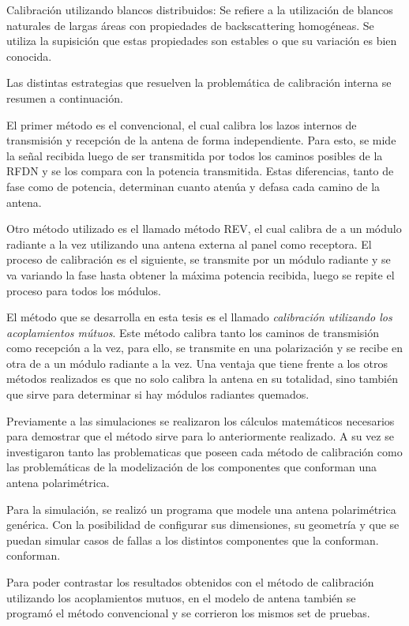 Calibración utilizando blancos distribuidos: Se refiere a la utilización de blancos naturales de largas áreas con 
propiedades de backscattering homogéneas. Se utiliza la supisición que estas propiedades son estables o que su variación es 
bien conocida.

Las distintas estrategias que resuelven la problemática de calibración interna se resumen a continuación. 

El primer método es el convencional, el cual calibra los lazos internos de transmisión y recepción de la antena de forma 
independiente. Para esto, se mide la señal recibida luego de ser transmitida por todos los caminos posibles de la RFDN
y se los compara con la potencia transmitida. Estas diferencias, tanto de fase como de potencia, determinan cuanto atenúa
y defasa cada camino de la antena. 

Otro método utilizado es el llamado método REV, el cual calibra de a un módulo radiante a la vez utilizando una antena externa
al panel como receptora. El proceso de calibración es el siguiente, se transmite por un módulo radiante y se va variando la 
fase hasta obtener la máxima potencia recibida, luego se repite el proceso para todos los módulos. 

El método que se desarrolla en esta tesis es el llamado \emph{calibración utilizando los acoplamientos mútuos}. Este método calibra 
tanto los caminos de transmisión como recepción a la vez, para ello, se transmite en una polarización y se recibe en otra de 
a un módulo radiante a la vez. Una ventaja que tiene frente a los otros métodos realizados es que no solo calibra la antena 
en su totalidad, sino también que sirve para determinar si hay módulos radiantes quemados.

Previamente a las simulaciones se realizaron los cálculos matemáticos necesarios para demostrar que el método sirve para 
lo anteriormente realizado. A su vez se investigaron tanto las problematicas que poseen cada método de calibración como
las problemáticas de la modelización de los componentes que conforman una antena polarimétrica.

Para la simulación, se realizó un programa que modele una antena polarimétrica genérica. Con la posibilidad de configurar 
sus dimensiones, su geometría y que se puedan simular casos de fallas a los distintos componentes que la conforman.
conforman.

Para poder contrastar los resultados obtenidos con el método de calibración utilizando los acoplamientos mutuos, en el modelo 
de antena también se programó el método convencional y se corrieron los mismos set de pruebas.


